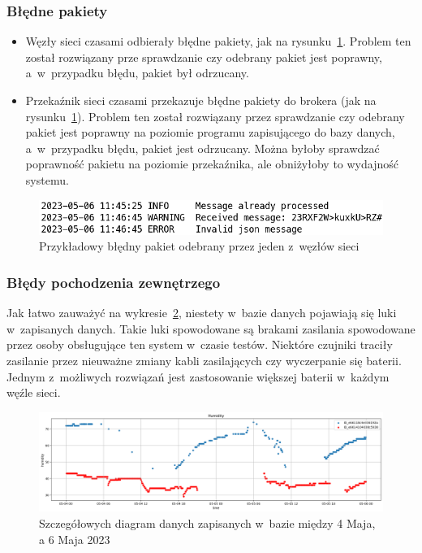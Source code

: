 \subsubsection{Błędne pakiety}
\begin{itemize}
    \item Węzły sieci czasami odbierały błędne pakiety, jak na rysunku~\ref{rys:zly-pakiet}. Problem ten został rozwiązany prze sprawdzanie czy odebrany pakiet jest poprawny, a~w~przypadku błędu, pakiet był odrzucany.
    \item Przekaźnik sieci czasami przekazuje błędne pakiety do brokera (jak na rysunku~\ref{rys:zly-pakiet}). Problem ten został rozwiązany przez sprawdzanie czy odebrany pakiet jest poprawny na poziomie programu zapisującego do bazy danych, a~w~przypadku błędu, pakiet jest odrzucany. Można byłoby sprawdzać poprawność pakietu na poziomie przekaźnika, ale obniżyłoby to wydajność systemu.
\end{itemize}

\begin{figure}[b!]
    \begin{center}
        \includegraphics[width=13cm]{pic/zly-pakiet.png}
    \end{center}
    \caption{Przykładowy błędny pakiet odebrany przez jeden z~węzłów sieci}\label{rys:zly-pakiet}
\end{figure}

\subsubsection{Błędy pochodzenia zewnętrzego}
Jak łatwo zauważyć na wykresie~\ref{rys:diagram-scat}, niestety w~bazie danych pojawiają się luki w~zapisanych danych.
Takie luki spowodowane są brakami zasilania spowodowane przez osoby obsługujące ten system w~czasie testów.
Niektóre czujniki traciły zasilanie przez nieuważne zmiany kabli zasilających czy wyczerpanie się baterii.
Jednym z~możliwych rozwiązań jest zastosowanie większej baterii w~każdym węźle sieci.

\begin{figure}[b!]
    \begin{center}
        \includegraphics[width=13cm]{pic/diagram-scat-humm.png}
    \end{center}
    \caption{Szczegółowych diagram danych zapisanych w~bazie między 4 Maja, a 6 Maja 2023}\label{rys:diagram-scat}
\end{figure}

